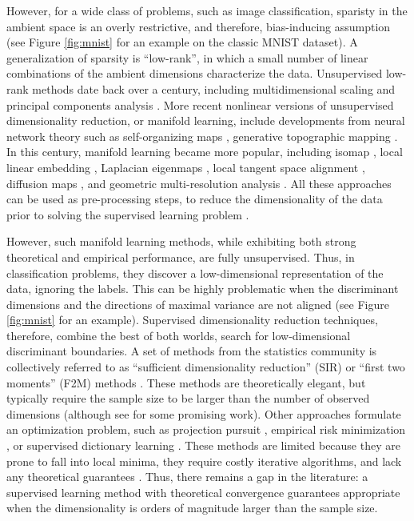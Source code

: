 \documentclass[10pt]{article}
\begin{document}
However, for a wide class of problems, such as image classification, sparisty in the ambient space is an overly restrictive, and therefore, bias-inducing assumption (see Figure \ref{fig:mnist} for an example on the classic MNIST dataset). A generalization of sparsity is ``low-rank'', in which a  small number of linear combinations of the ambient dimensions characterize the data.  Unsupervised low-rank methods date back over a century, including multidimensional scaling \cite{Young1938,Borg2010} and principal components analysis \cite{Pearson1901,Jolliffe2002}. More recent nonlinear versions of unsupervised dimensionality reduction, or manifold learning, include developments from neural network theory such as self-organizing maps \cite{Kohonen1982}, generative topographic mapping \cite{Bishop1998}. In this century, manifold learning became more popular, including isomap \cite{Tenenbaum2000}, local linear embedding \cite{Roweis2000}, Laplacian eigenmaps \cite{Belkin2003}, local tangent space alignment \cite{Zhang2004b}, diffusion maps \cite{Coifman2006},  and geometric multi-resolution analysis \cite{Allard12a}.  All these approaches can be used as pre-processing steps, to reduce the dimensionality of the data prior to solving the supervised learning problem \cite{Belhumeur1997}.

However, such manifold learning methods, while exhibiting both strong theoretical \cite{Eckart1936,deSilva2003, Allard12a} and empirical performance, are fully unsupervised.  Thus, in classification problems, they discover a low-dimensional representation of the data, ignoring the labels.  This can be highly problematic when the discriminant dimensions and the directions of maximal variance are not aligned (see Figure \ref{fig:mnist} for an example).  Supervised dimensionality reduction techniques, therefore, combine the best of both worlds, search for low-dimensional discriminant boundaries.  A set of methods from the statistics community is collectively referred to as   ``sufficient dimensionality reduction'' (SIR) or ``first two moments'' (F2M) methods  \cite{Li1991, TB99, Globerson2003, Cook2005,Fukumizu2004}.  These methods are theoretically elegant, but typically require the sample size to be larger than the number of observed dimensions (although see \cite{Cook13a} for some promising work).  Other approaches formulate an optimization problem, such as projection pursuit \cite{Huber1985}, empirical risk minimization \cite{Belkin2006}, or supervised dictionary learning \cite{Mairal2008}.  These methods are limited because they are prone to fall into local minima, they require costly iterative algorithms, and lack any theoretical guarantees \cite{Belkin2006}.   Thus, there remains a gap in the literature: a supervised learning method with theoretical convergence guarantees appropriate when the dimensionality is orders of magnitude larger than the sample size.
\end{document}
